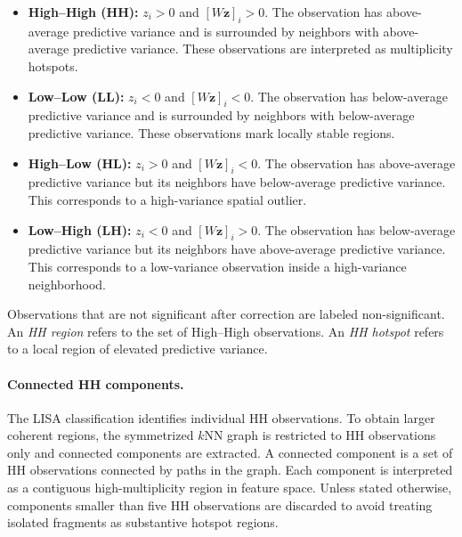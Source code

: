 \begin{itemize}
  \item \textbf{High--High (HH):} $z_i>0$ and $[W\mathbf{z}]_i>0$. The observation has
  above-average predictive variance and is surrounded by neighbors with above-average
  predictive variance. These observations are interpreted as multiplicity hotspots.

  \item \textbf{Low--Low (LL):} $z_i<0$ and $[W\mathbf{z}]_i<0$. The observation has
  below-average predictive variance and is surrounded by neighbors with below-average
  predictive variance. These observations mark locally stable regions.

  \item \textbf{High--Low (HL):} $z_i>0$ and $[W\mathbf{z}]_i<0$. The observation has
  above-average predictive variance but its neighbors have below-average predictive
  variance. This corresponds to a high-variance spatial outlier.

  \item \textbf{Low--High (LH):} $z_i<0$ and $[W\mathbf{z}]_i>0$. The observation has
  below-average predictive variance but its neighbors have above-average predictive
  variance. This corresponds to a low-variance observation inside a high-variance
  neighborhood.
\end{itemize}

Observations that are not significant after correction are labeled non-significant. An
\emph{HH region} refers to the set of High--High observations. An \emph{HH hotspot}
refers to a local region of elevated predictive variance.

\paragraph{Connected HH components.}
The LISA classification identifies individual HH observations. To obtain larger coherent
regions, the symmetrized $k$NN graph is restricted to HH observations only and connected
components are extracted. A connected component is a set of HH observations connected
by paths in the graph. Each component is interpreted as a contiguous high-multiplicity
region in feature space. Unless stated otherwise, components smaller than five HH observations
are discarded to avoid treating isolated fragments as substantive hotspot regions.

